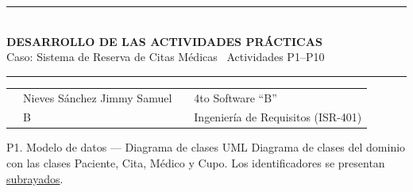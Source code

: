 \clearpage
\setcounter{section}{0}
\renewcommand{\thesection}{\Roman{section}}

\begin{center}
	{\color{gold}\rule{\linewidth}{1.2pt}}\\[6pt]
	{\Large\bfseries\color{darkblue} DESARROLLO DE LAS ACTIVIDADES PR\'ACTICAS}\\[3pt]
	{\normalsize\color{midblue} Caso: Sistema de Reserva de Citas M\'edicas \textbullet\ Actividades P1--P10}\\[6pt]
	{\color{gold}\rule{\linewidth}{1.2pt}}
\end{center}

\vspace{4pt}
\begin{center}\small
\begin{tabularx}{\linewidth}{@{}L{2.6cm} X L{2.6cm} X@{}}
	 & Nieves S\'anchez Jimmy Samuel &  & 4to Software ``B'' \\
	 & B &  & Ingenier\'ia de Requisitos (ISR-401) \\
\end{tabularx}
\end{center}

\begin{tarea}{P1. Modelo de datos --- Diagrama de clases UML}
Diagrama de clases del dominio con las clases \textsf{Paciente}, \textsf{Cita}, \textsf{M\'edico} y \textsf{Cupo}. Los identificadores se presentan \underline{subrayados}.
\end{tarea}

